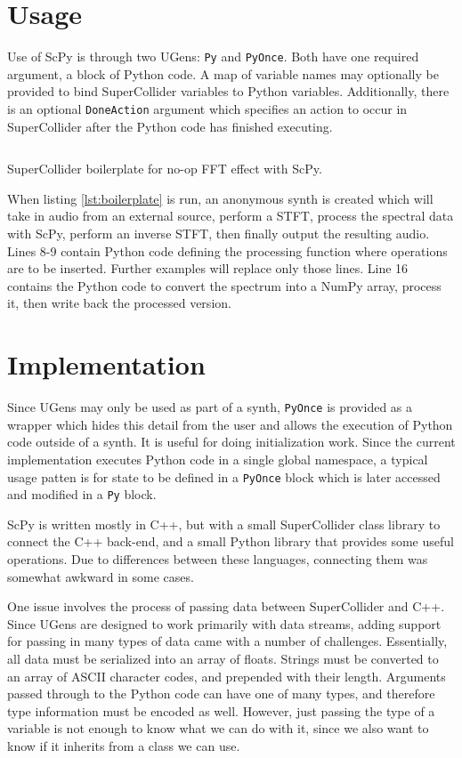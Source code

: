 \documentclass{article}
\begin{document}
\section{Usage}

Use of ScPy is through two UGens: \texttt{Py} and \texttt{PyOnce}. Both have one required argument,
a block of Python code. A map of variable names may optionally be provided to bind SuperCollider
variables to Python variables.  Additionally, there is an optional \texttt{DoneAction} argument which
specifies an action to occur in SuperCollider after the Python code has finished executing.

\begin{listing}[H]
    \inputminted[linenos=true]{SuperCollider}{../examples/template.sc}
    \caption{SuperCollider boilerplate for no-op FFT effect with ScPy.}
    \label{lst:boilerplate}
\end{listing}

When listing \ref{lst:boilerplate} is run, an anonymous synth is created which will take in audio
from an external source, perform a STFT, process the spectral data with ScPy, perform an inverse
STFT, then finally output the resulting audio. Lines 8-9 contain Python code defining the
processing function where operations are to be inserted. Further examples will replace only those
lines. Line 16 contains the Python code to convert the spectrum into a NumPy array, process it,
then write back the processed version.

\section{Implementation}

Since UGens may only be used as part of a synth, \texttt{PyOnce} is provided as a wrapper which
hides this detail from the user and allows the execution of Python code outside of a synth. It is
useful for doing initialization work.  Since the current implementation executes Python code in a
single global namespace, a typical usage patten is for state to be defined in a \texttt{PyOnce}
block which is later accessed and modified in a \texttt{Py} block.

ScPy is written mostly in C++, but with a small SuperCollider class library to connect the C++
back-end, and a small Python library that provides some useful operations. Due to differences
between these languages, connecting them was somewhat awkward in some cases.

One issue involves the process of passing data between SuperCollider and C++. Since UGens are
designed to work primarily with data streams, adding support for passing in many types of data came
with a number of challenges. Essentially, all data must be serialized into an array of floats.
Strings must be converted to an array of ASCII character codes, and prepended with their length.
Arguments passed through to the Python code can have one of many types, and therefore type
information must be encoded as well. However, just passing the type of a variable is not enough to
know what we can do with it, since we also want to know if it inherits from a class we can use.
\end{document}
